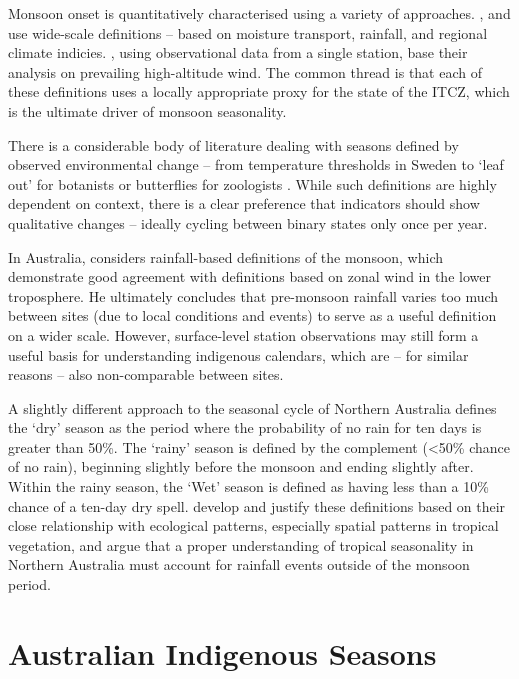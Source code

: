 Monsoon onset is quantitatively characterised using a variety of approaches.
\citet{sultan2003,fasullo2002}, and \citet{wu1998} use wide-scale definitions
-- based on moisture transport, rainfall, and regional climate indicies.
\citet{hendon1990}, using observational data from a single station, base their
analysis on prevailing high-altitude wind.  The common thread is that each of
these definitions uses a locally appropriate proxy for the state of the ITCZ,
which is the ultimate driver of monsoon seasonality.


There is a considerable body of literature dealing with seasons defined
by observed environmental change -- from temperature thresholds in Sweden
 to `leaf out' for botanists \citep[eg.][]{allstadt2015}
or butterflies for zoologists \citep[eg.][]{forister2003,roy2000}.
While such definitions are highly dependent on context, there is a clear
preference that indicators should show qualitative changes -- ideally cycling
between binary states only once per year.


In Australia, \citet{holland1985} considers rainfall-based definitions of the
monsoon, which demonstrate good agreement with definitions based on zonal
wind in the lower troposphere.  He ultimately concludes that pre-monsoon
rainfall varies too much between sites (due to local conditions and events)
to serve as a useful definition on a wider scale.
%
However, surface-level station observations may still form a useful basis for
understanding indigenous calendars, which are -- for similar reasons -- also
non-comparable between sites.

A slightly different approach to the seasonal cycle of Northern Australia
defines the `dry' season as the period where the probability
of no rain for ten days is greater than 50\%.  The `rainy' season is defined by
the complement (\textless50\% chance of no rain), beginning slightly before the
monsoon and ending slightly after.  Within the rainy season, the `Wet' season
is defined as having less than a 10\% chance of a ten-day dry spell.
%
\citet{cook2001} develop and justify these definitions based on their close relationship with
ecological patterns, especially spatial patterns in tropical vegetation,
and argue that a proper understanding of tropical seasonality in Northern
Australia must account for rainfall events outside of the monsoon period.



\section{Australian Indigenous Seasons}
\label{sec:aus-indig-seasons}

